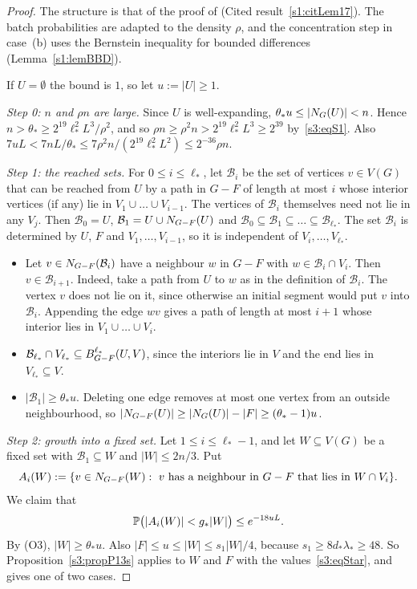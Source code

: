 \begin{proof}
The structure is that of the proof of \cite[Lemma~17]{BM}
(Cited result~\ref{s1:citLem17}). The batch probabilities are adapted to the
density $\rho$, and the concentration step in case~(b) uses the Bernstein
inequality for bounded differences (Lemma~\ref{s1:lemBBD}).

If $U=\emptyset$ the bound is $1$, so let $u:=|U|\ge1$.

\smallskip\noindent\emph{Step 0: $n$ and $\rho n$ are large.} Since $U$
is well-expanding, $\theta_*u\le|N_G(U)|<n$. Hence
$n>\theta_*\ge 2^{19}\ell_*^2L^3/\rho^2$, and so
$\rho n\ge\rho^2n>2^{19}\ell_*^2L^3\ge 2^{39}$ by~\ref{s3:eqS1}. Also
$7uL<7nL/\theta_*\le 7\rho^2n/(2^{19}\ell_*^2L^2)\le 2^{-36}\rho n$.

\smallskip\noindent\emph{Step 1: the reached sets.} For
$0\le i\le\ell_*$, let $\mathcal B_i$ be the set of vertices $v\in V(G)$
that can be reached from $U$ by a path in $G-F$ of length at most $i$
whose interior vertices (if any) lie in $V_1\cup\dots\cup V_{i-1}$. The
vertices of $\mathcal B_i$ themselves need not lie in any $V_j$. Then
$\mathcal B_0=U$, $\mathcal B_1=U\cup N_{G-F}(U)$ and
$\mathcal B_0\subseteq\mathcal B_1\subseteq\dots\subseteq\mathcal
B_{\ell_*}$. The set $\mathcal B_i$ is determined by $U$, $F$ and
$V_1,\dots,V_{i-1}$, so it is independent of $V_i,\dots,V_{\ell_*}$.
\begin{itemize}
\item[(O1)] Let $v\in N_{G-F}(\mathcal B_i)$ have a neighbour $w$ in
  $G-F$ with $w\in\mathcal B_i\cap V_i$. Then
  $v\in\mathcal B_{i+1}$. Indeed, take a path from $U$ to $w$ as in the
  definition of $\mathcal B_i$. The vertex $v$ does not lie on it, since
  otherwise an initial segment would put $v$ into $\mathcal B_i$.
  Appending the edge $wv$ gives a path of length at most $i+1$ whose
  interior lies in $V_1\cup\dots\cup V_i$.
\item[(O2)] $\mathcal B_{\ell_*}\cap V_{\ell_*}\subseteq B^{\ell_*}_{G-F}(U,V)$,
  since the interiors lie in $V$ and the end lies in $V_{\ell_*}\subseteq V$.
\item[(O3)] $|\mathcal B_1|\ge\theta_*u$. Deleting one edge removes at
  most one vertex from an outside neighbourhood, so
  $|N_{G-F}(U)|\ge|N_G(U)|-|F|\ge(\theta_*-1)u$.
\end{itemize}

\smallskip\noindent\emph{Step 2: growth into a fixed set.} Let
$1\le i\le\ell_*-1$, and let $W\subseteq V(G)$ be a fixed set with
$\mathcal B_1\subseteq W$ and $|W|\le 2n/3$. Put
\[
A_i(W):=\{v\in N_{G-F}(W):\ v\text{ has a neighbour in }G-F\text{ that lies in }W\cap V_i\}.
\]
We claim that
\begin{equation}\label{s3:eqL17claim}
\mathbb{P}\big(|A_i(W)|<g_*|W|\big)\le e^{-18uL}.
\end{equation}
By (O3), $|W|\ge\theta_*u$. Also $|F|\le u\le|W|\le s_1|W|/4$, because
$s_1\ge8d_*\lambda_*\ge48$. So Proposition~\ref{s3:propP13s} applies to
$W$ and $F$ with the values~\eqref{s3:eqStar}, and gives one of two
cases.


\end{proof}

